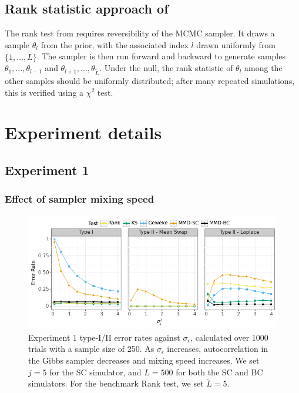 \documentclass{article}
\begin{document}
\subsection{Rank statistic approach of \cite{gandy_unit_2020}}
The rank test from \cite{gandy_unit_2020} requires reversibility of the MCMC sampler. It draws a sample $\theta_{l}$ from the prior, with the associated index $l$ drawn uniformly from $\{1,\ldots,\tilde{L}\}$. The sampler is then run forward and backward to generate samples $\theta_{1}, \ldots, \theta_{l-1}$ and $\theta_{l+1}, \ldots, \theta_{\tilde{L}} $. Under the null, the rank statistic of $\theta_{l}$ among the other samples should be uniformly distributed; after many repeated simulations, this is verified using a $\chi^{2}$ test.



\section{Experiment details}
\subsection{Experiment 1}
\subsubsection{Effect of sampler mixing speed}
\begin{figure}[H]
    \centering
    \includegraphics[width=\textwidth]{figures/results_1a.png}
    \caption{Experiment 1 type-I/II error rates against $\sigma_{\epsilon}$, calculated over 1000 trials with a sample size of 250. As $\sigma_{\epsilon}$ increases, autocorrelation in the Gibbs sampler decreases and mixing speed increases. We set $j=5$ for the SC simulator, and $L=500$ for both the SC and BC simulators. For the benchmark Rank test, we set $\tilde{L}=5$.}
    \label{fig:ex1_auto}
\end{figure}
\end{document}

